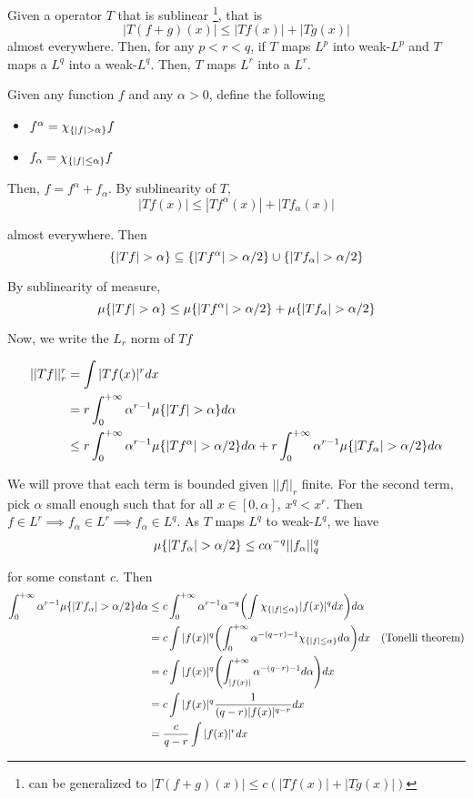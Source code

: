 \documentclass{report}
\begin{document}
\begin{theorem}
    Given a operator $T$ that is sublinear \footnote{can be generalized to $|T(f + g)(x)| \leq c(|Tf(x)| + |Tg(x)|)$}, that is
    \[
        |T(f + g)(x)| \leq |Tf(x)| + |Tg(x)|
    \]
    almost everywhere. Then, for any $p < r < q$, if $T$ maps $L^{p}$ into weak-$L^{p}$ and $T$ maps a $L^{q}$ into a weak-$L^{q}$. Then, $T$ maps $L^r$ into a $L^r$.
\end{theorem}

Given any function $f$ and any $\alpha > 0$, define the following

\begin{itemize}
    \item $f^\alpha = \chi_{\{|f| > \alpha\}} f$
    \item $f_\alpha = \chi_{\{|f| \leq \alpha\}} f$
\end{itemize}

Then, $f = f^\alpha + f_\alpha$. By sublinearity of $T$,
\[
    |Tf(x)| \leq |Tf^\alpha(x)| + |Tf_\alpha(x)|
\]

almost everywhere. Then
\[
    \{|Tf| > \alpha\} \subseteq \{|Tf^\alpha| > \alpha/2\} \cup \{|Tf_\alpha| > \alpha/2\}
\]

By sublinearity of measure,
\[
    \mu \{|Tf| > \alpha\} \leq \mu \{|Tf^\alpha| > \alpha/2\} + \mu \{|Tf_\alpha| > \alpha/2\}
\]

Now, we write the $L_r$ norm of $Tf$

\begin{align*}
    ||Tf||_r^r
    &= \int |Tf(x)|^r dx \\
    &= r \int_0^{+\infty} \alpha^{r-1} \mu \{|Tf| > \alpha\} d\alpha \\
    &\leq r \int_0^{+\infty} \alpha^{r-1} \mu \{|Tf^\alpha| > \alpha/2\} d\alpha + r \int_0^{+\infty} \alpha^{r-1} \mu \{|Tf_\alpha| > \alpha/2\} d\alpha\\
\end{align*}

We will prove that each term is bounded given $||f||_r$ finite. For the second term, pick $\alpha$ small enough such that for all $x \in [0, \alpha]$, $x^q < x^r$. Then $f \in L^r \implies f_\alpha \in L^r \implies f_\alpha \in L^q$. As $T$ maps $L^q$ to weak-$L^q$, we have
\[
    \mu \{|Tf_\alpha| > \alpha/2\} \leq c \alpha^{-q} ||f_\alpha||_q^q
\]

for some constant $c$. Then
\begin{align*}
    \int_0^{+\infty} \alpha^{r-1} \mu \set{|Tf_\alpha| > \alpha/2} d\alpha
    &\leq c \int_0^{+\infty} \alpha^{r-1} \alpha^{-q} \tuple*{\int \chi_{\set{|f| \leq \alpha}} |f(x)|^q dx} d\alpha \\
    &= c \int |f(x)|^q \tuple*{\int_0^{+\infty} \alpha^{-(q-r)-1} \chi_{\set{|f| \leq \alpha}} d\alpha} dx &\text{(Tonelli theorem)} \\
    &= c \int |f(x)|^q \tuple*{\int_{|f(x)|}^{+\infty} \alpha^{-(q-r)-1} d\alpha} dx \\
    &= c \int |f(x)|^q \frac{1}{(q-r) |f(x)|^{q-r}} dx \\
    &= \frac{c}{q-r} \int |f(x)|^r dx \\
\end{align*}
\end{document}
